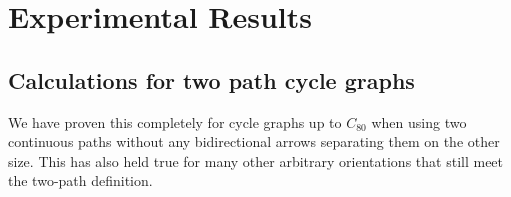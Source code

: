 \documentclass[11pt,reqno]{amsart}
\theoremstyle{definition}
\theoremstyle{plain}
\begin{document}
\section{Experimental Results}
	\subsection{Calculations for two path cycle graphs}
		We have proven this completely for cycle graphs up to $C_{80}$ when using two continuous paths without
		any bidirectional arrows separating them on the other size.  This has also held true for many other
		arbitrary orientations that still meet the two-path definition.


\end{document}
